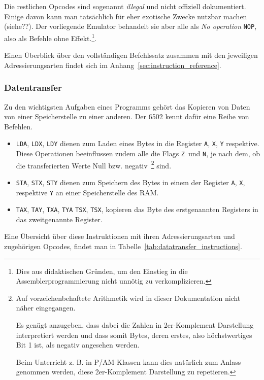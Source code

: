 \documentclass[11pt]{scrartcl}
\newcommand{\nflag}{\texttt{N}}
\newcommand{\zflag}{\texttt{Z}}
\begin{document}
Die restlichen Opcodes sind sogenannt \emph{illegal} und nicht
offiziell dokumentiert. Einige davon kann man tatsächlich für eher
exotische Zwecke nutzbar machen (siehe??). Der vorliegende Emulator
behandelt sie aber alle als \emph{No operation} \texttt{NOP}, also als
Befehle ohne Effekt.\footnote{Dies aus didaktischen Gründen, um den
  Einstieg in die Assemblerprogrammierung nicht unnötig zu
  verkomplizieren.}.

Einen Überblick über den vollständigen Befehlssatz zusammen mit den jeweiligen Adressierungsarten findet sich im Anhang~\ref{sec:instruction_reference}.

\subsubsection{Datentransfer}
\label{sec:datatransfer_instructions}
Zu den wichtigsten Aufgaben eines Programms gehört das Kopieren von
Daten von einer Speicherstelle zu einer anderen. Der 6502 kennt dafür
eine Reihe von Befehlen.

\begin{itemize}
\item \texttt{LDA}, \texttt{LDX}, \texttt{LDY} dienen zum Laden eines
  Bytes in die Register \texttt{A}, \texttt{X}, \texttt{Y} respektive.
  Diese Operationen beeinflussen zudem alle die Flags \zflag\ und \nflag,
  je nach dem, ob die transferierten Werte Null
  bzw. negativ~\footnote{Auf vorzeichenbehaftete Arithmetik wird in
    dieser Dokumentation nicht näher eingegangen.
    
    Es genügt anzugeben, dass dabei die Zahlen in 2er-Komplement
    Darstellung interpretiert werden und dass somit Bytes, deren erstes,
    also höchstwertiges Bit 1 ist, als negativ angesehen werden.
    
    Beim Unterricht z. B. in P/AM-Klassen kann dies natürlich zum Anlass
    genommen werden, diese 2er-Komplement Darstellung zu repetieren.}
  sind.
\item \texttt{STA}, \texttt{STX}, \texttt{STY} dienen zum Speichern
  des Bytes in einem der  Register \texttt{A}, \texttt{X}, respektive
  \texttt{Y} an einer Speicherstelle des RAM.
\item \texttt{TAX}, \texttt{TAY}, \texttt{TXA}, \texttt{TYA}
  \texttt{TSX}, \texttt{TSX}, kopieren das Byte des erstgenannten
  Registers in das zweitgenannte Register.
\end{itemize}



Eine Übersicht über diese Instruktionen mit ihren Adressierungsarten
und zugehörigen Opcodes, findet man in
Tabelle~\ref{tab:datatransfer_instructions}.
\end{document}
